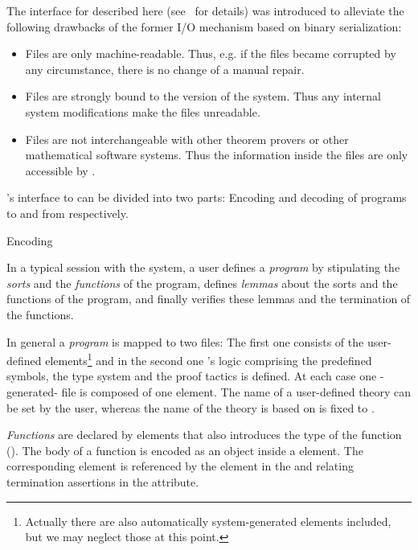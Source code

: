 \begin{omgroup}[id=verifun,short=VeriFun,creators={nmueller}]
The {\omdoc} interface for {\verifun} described here (see~\cite{NRM:DA05} for details) was
introduced to alleviate the following drawbacks of the former I/O mechanism based on
{\java} binary serialization:
\begin{itemize}
\item Files are only machine-readable. Thus, e.g. if the files became corrupted by any
  circumstance, there is no change of a manual repair.
\item Files are strongly bound to the version of the system. Thus any internal system
  modifications make the files unreadable.
\item Files are not interchangeable with other theorem provers or other mathematical
  software systems. Thus the information inside the files are only accessible by
  {\verifun}.
\end{itemize}

{\verifun}'s interface to {\omdoc} can be divided into two parts: Encoding and decoding of
{\verifun} programs to and from {\omdoc} respectively.

\begin{omgroup}{Encoding}

In a typical session with the system, a user defines a {\emph{program}} by stipulating the
{\emph{sorts}} and the {\emph{functions}} of the program, defines {\emph{lemmas}} about
the sorts and the functions of the program, and finally verifies these lemmas and the
termination of the functions.

In general a {\emph{program}} is mapped to two {\omdoc} files: The first one consists of
the user-defined elements\footnote{Actually there are also automatically system-generated
  elements included, but we may neglect those at this point.} and in the second one
{\mbox{{\verifun}'s}} logic comprising the predefined symbols, the type system and the
proof tactics is defined. At each case one {\verifun}-generated-{\omdoc} file is composed
of one {} element. The name of a user-defined theory can be set by the
user, whereas the name of the theory {\mbox{\verifun}} is based on is fixed to
{}.

{\emph{Functions}} are declared by {} elements that also introduces the
type of the function ().  The body of a function is encoded as
an {\openmath} object inside a {} element. The corresponding
{} element is referenced by the {} element in the
{} and relating termination assertions in the
{} attribute.


\end{omgroup}
\end{omgroup}
